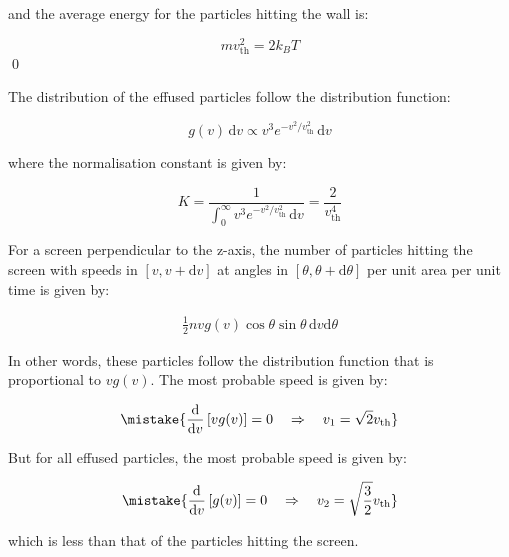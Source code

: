 \documentclass[12pt]{article}
\begin{document}
and the average energy for the particles hitting the wall is:

\begin{equation}
    mv_{\text{th}}^{2} = 2k_{B} T
\end{equation}
\qed



The distribution of the effused particles follow the distribution function:

\begin{equation}
    g(v) \, \mathrm{d}v \propto v^{3} e^{-v^{2}/v_{\text{th}}^{2}} \, \mathrm{d}v
\end{equation}

where the normalisation constant is given by:

\begin{equation}
    K = \frac{1}{\int_{0}^{\infty} v^{3} e^{-v^{2}/v_{\text{th}}^{2}} \, \mathrm{d}v} = \frac{2}{v_{\text{th}}^{4}}
\end{equation}

For a screen perpendicular to the z-axis, the number of particles hitting the screen with speeds in $[v, v + \mathrm{d}v]$ at angles in $[\theta, \theta + \mathrm{d}\theta]$ per unit area per unit time is given by:

\begin{equation}
    \begin{split}
        \frac{1}{2} nv g(v) \cos{\theta} \sin{\theta} \, \mathrm{d}v \mathrm{d}\theta
    \end{split}
\end{equation}

In other words, these particles follow the distribution function that is proportional to $v g(v)$. The most probable speed is given by:

\begin{equation}
    \mistake{\frac{\mathrm{d}}{\mathrm{d}v} \left[ v g(v) \right] = 0 \quad \Rightarrow \quad v_{1} = \sqrt{2} v_{\text{th}}}
\end{equation}

But for all effused particles, the most probable speed is given by:

\begin{equation}
    \mistake{\frac{\mathrm{d}}{\mathrm{d}v} \left[ g(v) \right] = 0 \quad \Rightarrow \quad v_{2} = \sqrt{\frac{3}{2}} v_{\text{th}}}
\end{equation}

which is less than that of the particles hitting the screen.
\end{document}
